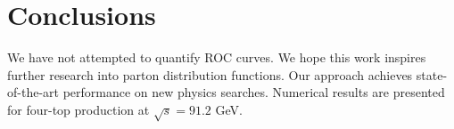 \section{Conclusions}\label{sec:conclusions}

We have not attempted to quantify ROC curves. We hope this work inspires
further research into parton distribution functions. Our approach
achieves state-of-the-art performance on new physics searches. Numerical
results are presented for four-top production at $\sqrt{s} = 91.2$ GeV.

